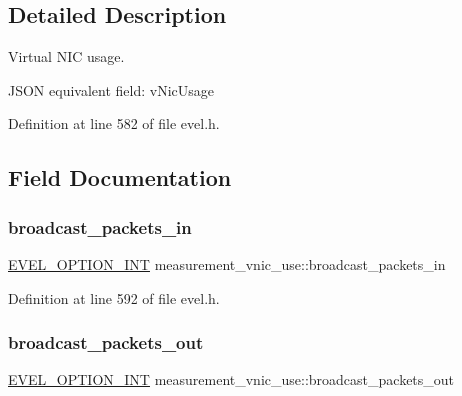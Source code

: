 \subsection{Detailed Description}
Virtual N\+IC usage. 

J\+S\+ON equivalent field\+: v\+Nic\+Usage 

Definition at line 582 of file evel.\+h.



\subsection{Field Documentation}
\hypertarget{structmeasurement__vnic__use_ad389902a9393b27a6feca5025543687b}{}\label{structmeasurement__vnic__use_ad389902a9393b27a6feca5025543687b} 
\subsubsection{\texorpdfstring{broadcast\+\_\+packets\+\_\+in}{broadcast\_packets\_in}}
{\footnotesize\ttfamily \hyperlink{evel_8h_a452d825778d1c2368a54b8f689a25ba7}{E\+V\+E\+L\+\_\+\+O\+P\+T\+I\+O\+N\+\_\+\+I\+NT} measurement\+\_\+vnic\+\_\+use\+::broadcast\+\_\+packets\+\_\+in}



Definition at line 592 of file evel.\+h.

\hypertarget{structmeasurement__vnic__use_ac6b9e16ed9578dcd78997f30a486c23d}{}\label{structmeasurement__vnic__use_ac6b9e16ed9578dcd78997f30a486c23d} 
\subsubsection{\texorpdfstring{broadcast\+\_\+packets\+\_\+out}{broadcast\_packets\_out}}
{\footnotesize\ttfamily \hyperlink{evel_8h_a452d825778d1c2368a54b8f689a25ba7}{E\+V\+E\+L\+\_\+\+O\+P\+T\+I\+O\+N\+\_\+\+I\+NT} measurement\+\_\+vnic\+\_\+use\+::broadcast\+\_\+packets\+\_\+out}



